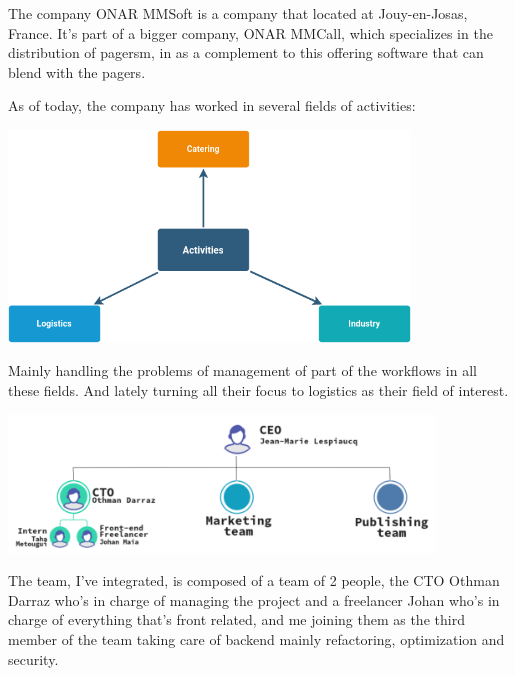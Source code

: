 The company ONAR MMSoft is a company that located at Jouy-en-Josas, France.
It's part of a bigger company, ONAR MMCall, which specializes in the distribution of pagersm, in as a complement to this offering software that can blend with the pagers.

As of today, the company has worked in several fields of activities:

\begin{center}
    \includegraphics[width=0.8\textwidth]{images/core_activities.png}
\end{center}

Mainly handling the problems of management of part of the workflows in all these fields. 
And lately turning all their focus to logistics as their field of interest.

\begin{center}
    \includegraphics[width=0.85\textwidth]{images/Hierarchy}
\end{center}

The team, I've integrated, is composed of a team of 2 people, the CTO Othman Darraz who's in charge of managing the project
and a freelancer Johan who's in charge of everything that's front related, and me joining them as the third
member of the team taking care of backend mainly refactoring, optimization and security.



